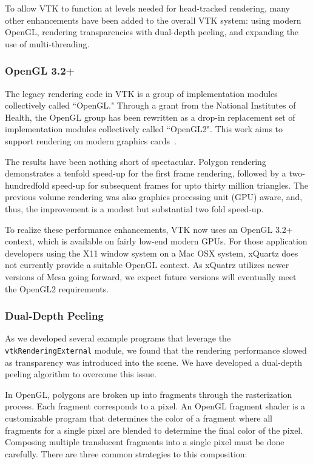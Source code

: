 To allow VTK to function at levels needed for head-tracked rendering,
many other enhancements have been added to the overall VTK system:
using modern OpenGL,
rendering transparencies with dual-depth peeling, and
expanding the use of multi-threading.

\subsubsection{OpenGL 3.2+}

The legacy rendering code in VTK is a group of implementation modules collectively called ``OpenGL."
Through a grant from the National Institutes of Health, the OpenGL group has
been rewritten as a drop-in replacement set of implementation modules
collectively called ``OpenGL2".
This work aims to support rendering on modern graphics cards~\cite{Hanwell:2015}.

The results have been nothing short of spectacular.
Polygon rendering demonstrates a tenfold speed-up for the first frame rendering, followed by a two-hundredfold speed-up for subsequent frames for upto thirty million triangles.
The previous volume rendering was also graphics processing unit (GPU) aware, and, thus, the improvement is a modest but substantial two fold speed-up. 

To realize these performance enhancements, VTK now uses an OpenGL 3.2+ context, which is available on fairly low-end modern GPUs.
For those application developers using the X11 window system on a Mac OSX system, xQuartz does not currently provide a suitable OpenGL context.
As xQuatrz utilizes newer versions of Mesa going forward, we expect future versions will eventually meet the OpenGL2 requirements.

\subsubsection{Dual-Depth Peeling}

As we developed several example programs that leverage the \texttt{vtkRenderingExternal} module, we found that the rendering performance slowed as transparency was introduced into the scene. We have developed a dual-depth peeling algorithm to overcome this issue.

In OpenGL, polygons are broken up into fragments through the rasterization process.
Each fragment corresponds to a pixel.
An OpenGL fragment shader is a customizable program that determines the color of a fragment where all fragments for a single pixel are blended to determine the final color of the pixel.
Composing multiple translucent fragments into a single pixel must be done carefully.
There are three common strategies to this composition:

